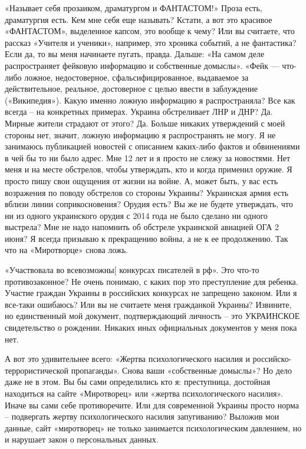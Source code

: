 «Называет себя прозаиком, драматургом и ФАНТАСТОМ!» Проза есть, драматургия
есть. Кем мне себя еще называть? Кстати, а вот это красивое «ФАНТАСТОМ»,
выделенное капсом, это вообще к чему? Или вы считаете, что рассказ «Учителя и
ученики», например, это хроника событий, а не фантастика? Если да, то вы меня
начинаете пугать, правда. Дальше: «На самом деле распространяет фейковую
информацию и собственные домыслы». «Фейк — что-либо ложное, недостоверное,
сфальсифицированное, выдаваемое за действительное, реальное, достоверное с
целью ввести в заблуждение («Википедия»). Какую именно ложную информацию я
распространяла? Все как всегда – на конкретных примерах. Украина обстреливает
ЛНР и ДНР? Да. Мирные жители страдают от этого? Да. Больше никаких утверждений
с моей стороны нет, значит, ложную информацию я распространять не могу. Я не
занимаюсь публикацией новостей с описанием каких-либо фактов и обвинениями в
чей бы то ни было адрес. Мне 12 лет и я просто не слежу за новостями. Нет меня
и на месте обстрелов, чтобы утверждать, кто и когда применил оружие. Я просто
пишу свои ощущения от жизни на войне. А, может быть, у вас есть возражения по
поводу обстрелов со стороны Украины? Украинская армия есть вблизи линии
соприкосновения? Орудия есть? Вы же не будете утверждать, что ни из одного
украинского орудия с 2014 года не было сделано ни одного выстрела? Мне не надо
напомнить об обстреле украинской авиацией ОГА 2 июня? Я всегда призываю к
прекращению войны, а не к ее продолжению. Так что на «Миротворце» снова ложь.

«Участвовала во всевозможны[ конкурсах писателей в рф». Это что-то
противозаконное? Не очень понимаю, с каких пор это преступление для ребенка.
Участие граждан Украины в российских конкурсах не запрещено законом. Или я
все-таки ошибаюсь? Или вы не считаете меня гражданкой Украины? Извините, но
единственный мой документ, подтверждающий личность – это УКРАИНСКОЕ
свидетельство о рождении. Никаких иных официальных документов у меня пока нет.

А вот это удивительнее всего: «Жертва психологического насилия и
российско-террористической пропаганды». Снова ваши «собственные домыслы»? Но
дело даже не в этом. Вы бы сами определились кто я: преступница, достойная
находиться на сайте «Миротворец» или «жертва психологического насилия». Иначе
вы сами себе противоречите. Или для современной Украины просто норма –
подвергать жертву психологического насилия запугиванию? Выложив мои данные,
сайт «миротворец» не только занимается психологическим давлением, но и нарушает
закон о персональных данных.

